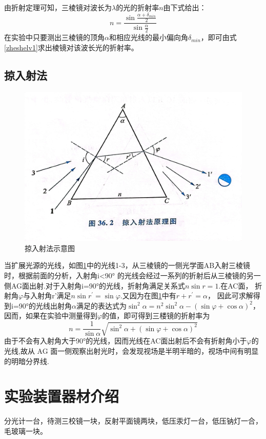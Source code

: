 \documentclass{ctexart}
\begin{document}
  由折射定理可知，三棱镜对波长为$\lambda$的光的折射率$n$由下式给出：
  \begin{equation}\label{zheshelv1}
    n=\frac{\sin\frac{\alpha+\delta_{min}}{2}}{\sin\frac{\alpha}{2}}
  \end{equation}
  在实验中只要测出三棱镜的顶角$\alpha$和相应光线的最小偏向角$\delta_{min}$，即可由式\ref{zheshelv1}求出棱镜对该波长光的折射率。

  \subsection{掠入射法}
  \begin{figure}[H]
    \centering
    \includegraphics[height=0.6\textwidth,width=1\textwidth]{luerushefa.jpg}
    \caption{掠入射法示意图}\label{luerushefa}
  \end{figure}
  当扩展光源的光线，如图\ref{luerushefa}中的光线1-3，从三棱镜的一侧光学面AB入射三棱镜时，根据前面的分析，入射角i<90°
  的光线会经过一系列的折射后从三棱镜的另一侧AG面出射.对于入射角i=90°的光线，折射角满足关系式$n\sin r =1$.在AC面，
  折射角$\varphi$与入射角r'满足$n\sin r^{'}=\sin \varphi$.又因为在图\ref{luerushefa}中有$r+r^{'}=\alpha$，
  因此可求解得到i=90°的光线出射角$\alpha$满足的表达式为$\sin^{2}\alpha=n^{2}\sin^{2}\alpha-(\sin\varphi+\cos\alpha)^{2}$，
  因而，如果在实验中测量得到$\varphi$的值，即可得到三楼镜的折射率为
  \begin{equation}\label{zheshelv2}
    n=\frac{1}{\sin\alpha}\sqrt{\sin^{2}\alpha+(\sin\varphi+\cos\alpha)^{2}}
  \end{equation}
  由于不会有入射角大于90°的光线，因而光线在AC面出射后不会有折射角小于$\varphi$的光线,故从 AG 面一侧观察出射光时，会发现视场是半明半暗的，视场中间有明显的明暗分界线.

\section{实验装置器材介绍}
分光计一台，待测三校镜一块，反射平面镜两块，低压汞灯一台，低压钠灯一合，毛玻璃一块。
\end{document}

